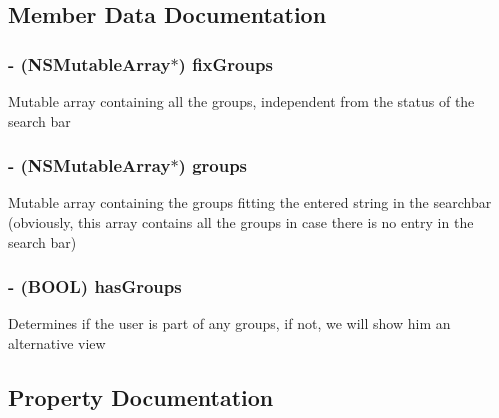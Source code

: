 \subsection{Member Data Documentation}
\hypertarget{category_e_s_groups_view_07_08_acfd5ac0d02856eff3eea8bebbd9090d7}{}
\subsubsection[{fix\+Groups}]{\setlength{\rightskip}{0pt plus 5cm}-\/ (N\+S\+Mutable\+Array$\ast$) fix\+Groups\hspace{0.3cm}{\ttfamily [protected]}}\label{category_e_s_groups_view_07_08_acfd5ac0d02856eff3eea8bebbd9090d7}
Mutable array containing all the groups, independent from the status of the search bar \hypertarget{category_e_s_groups_view_07_08_a596689a0105424b4b7d7e7e3bc257511}{}
\subsubsection[{groups}]{\setlength{\rightskip}{0pt plus 5cm}-\/ (N\+S\+Mutable\+Array$\ast$) groups\hspace{0.3cm}{\ttfamily [protected]}}\label{category_e_s_groups_view_07_08_a596689a0105424b4b7d7e7e3bc257511}
Mutable array containing the groups fitting the entered string in the searchbar (obviously, this array contains all the groups in case there is no entry in the search bar) \hypertarget{category_e_s_groups_view_07_08_ae6de7a52fa81eb67912469107b513e0c}{}
\subsubsection[{has\+Groups}]{\setlength{\rightskip}{0pt plus 5cm}-\/ (B\+O\+O\+L) has\+Groups\hspace{0.3cm}{\ttfamily [protected]}}\label{category_e_s_groups_view_07_08_ae6de7a52fa81eb67912469107b513e0c}
Determines if the user is part of any groups, if not, we will show him an alternative view 

\subsection{Property Documentation}
\hypertarget{category_e_s_groups_view_07_08_ac87ef0c6673162f8995415427fa4e3dc}{}
